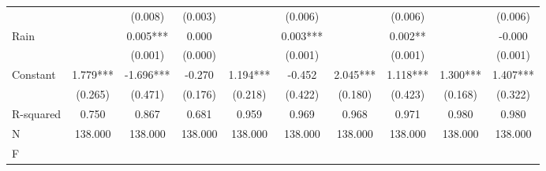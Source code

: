 {\begin{tabular}{l*{9}{c}}
                    &               &     (0.008)   &     (0.003)   &               &     (0.006)   &               &     (0.006)   &               &     (0.006)   \\
Rain                &               &       0.005***&       0.000   &               &       0.003***&               &       0.002** &               &      -0.000   \\
                    &               &     (0.001)   &     (0.000)   &               &     (0.001)   &               &     (0.001)   &               &     (0.001)   \\
Constant            &       1.779***&      -1.696***&      -0.270   &       1.194***&      -0.452   &       2.045***&       1.118***&       1.300***&       1.407***\\
                    &     (0.265)   &     (0.471)   &     (0.176)   &     (0.218)   &     (0.422)   &     (0.180)   &     (0.423)   &     (0.168)   &     (0.322)   \\
\hline
R-squared           &       0.750   &       0.867   &       0.681   &       0.959   &       0.969   &       0.968   &       0.971   &       0.980   &       0.980   \\
N                   &     138.000   &     138.000   &     138.000   &     138.000   &     138.000   &     138.000   &     138.000   &     138.000   &     138.000   \\
F                   &               &               &               &               &               &               &               &               &               \\
\hline\hline
\end{tabular}
}
